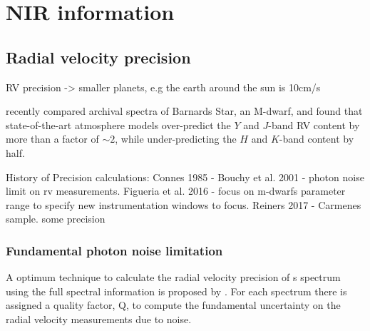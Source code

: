 
\chapter{NIR information}  %

\label{cha:nir_content}


\section{Radial velocity precision}
RV precision -> smaller planets, e.g the earth around the sun is 10cm/s

\citet{artigau_optical_2018} recently compared archival spectra of Barnards Star, an M-dwarf, and found that state-of-the-art atmosphere models over-predict the $Y$ and $J$-band RV content by more than a factor of $\sim$$2$, while under-predicting the $H$ and $K$-band content by half.
 

History of Precision calculations:
Connes 1985 -
Bouchy et al. 2001  - photon noise limit on rv measurements.   
Figueria et al. 2016 - focus on m-dwarfs parameter range to specify new instrumentation windows to focus.
Reiners 2017 -  Carmenes sample. some precision



\subsection{Fundamental photon noise limitation}
A optimum technique to calculate the radial velocity precision of s spectrum using the full spectral information is proposed by \citet{Connes1985}. For each spectrum there is assigned a quality factor, Q, to compute the fundamental uncertainty on the radial velocity measurements due to noise.

